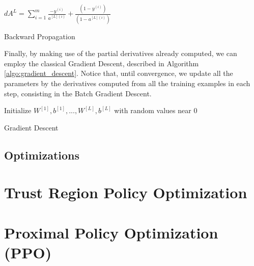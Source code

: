 \begin{algorithm}[H]
    \DontPrintSemicolon
    \SetAlgoLined
    $dA^{L} = \sum_{i=1}^m{\frac{-y^{(i)}}{a^{[L](i)}} + \frac{(1-y^{(i)})}{(1-a^{[L](i)})}}$\;
    \caption{Backward Propagation}
    \label{algo:backward_propagation}
\end{algorithm}

Finally, by making use of the partial derivatives already computed, we can employ the classical Gradient Descent, described in Algorithm \ref{algo:gradient_descent}. Notice that, until convergence, we update all the parameters by the derivatives computed from all the training examples in each step, consisting in the Batch Gradient Descent.

\begin{algorithm}[H]
    \DontPrintSemicolon
    \SetAlgoLined
    Initialize $W^{[1]},b^{[1]},...,W^{[L]},b^{[L]}$ with random values near $0$\;
    \caption{Gradient Descent}
    \label{algo:gradient_descent}
\end{algorithm}


\subsection{Optimizations}

\section{Trust Region Policy Optimization}


\section{Proximal Policy Optimization (PPO)}
